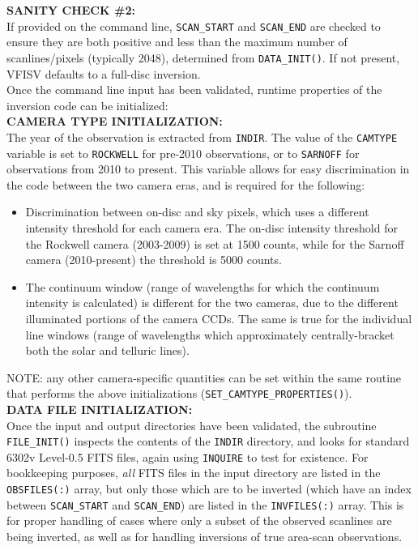 \documentclass[11pt]{article}
\begin{document}
\textbf{SANITY CHECK \#2:}\\
If provided on the command line, \texttt{SCAN\_START} and \texttt{SCAN\_END} are checked to ensure
they are both positive and less than the maximum number of scanlines/pixels (typically 2048),
determined from \texttt{DATA\_INIT()}.  If not present, VFISV defaults to a full-disc inversion.\\

Once the command line input has been validated, runtime properties of the inversion
code can be initialized:\\

\textbf{CAMERA TYPE INITIALIZATION:}\\
The year of the observation is extracted from \texttt{INDIR}.  The value of the 
\texttt{CAMTYPE} variable is set to \texttt{ROCKWELL} for pre-2010 observations, or
to \texttt{SARNOFF} for observations from 2010 to present.  This variable allows
for easy discrimination in the code between the two camera eras, and is required for the
following:

\begin{itemize}
  \renewcommand\labelitemi{\scriptsize$\blacksquare$}
  \item Discrimination between on-disc and sky pixels, which uses a different
        intensity threshold for each camera era.  The on-disc intensity threshold for 
        the Rockwell camera (2003-2009) is set at 1500 counts, while for the Sarnoff
        camera (2010-present) the threshold is 5000 counts.
  \item The continuum window (range of wavelengths for which the continuum intensity
        is calculated) is different for the two cameras, due to the different
        illuminated portions of the camera CCDs.  The same is true for the individual 
        line windows (range of wavelengths which approximately centrally-bracket both
        the solar and telluric lines).
\end{itemize}

NOTE: any other camera-specific quantities can be set within the same routine that
performs the above initializations (\texttt{SET\_CAMTYPE\_PROPERTIES()}).\\

\textbf{DATA FILE INITIALIZATION:}\\
Once the input and output directories have been validated, the subroutine \texttt{FILE\_INIT()}
inspects the contents of the \texttt{INDIR} directory, and looks for standard \solisvsm 6302v
Level-0.5 FITS files, again using \texttt{INQUIRE} to test for existence.  For
bookkeeping purposes, \textit{all} FITS files in the input directory are listed
in the \texttt{OBSFILES(:)} array, but only those which are to be inverted (which have
an index between \texttt{SCAN\_START} and \texttt{SCAN\_END}) are listed
in the \texttt{INVFILES(:)} array.  This is for proper handling of cases where only
a subset of the observed scanlines are being inverted, as well as for handling
inversions of true area-scan observations.\\
\end{document}

